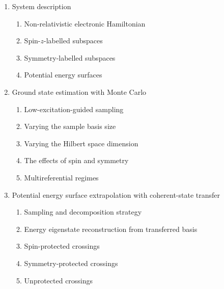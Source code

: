 \documentclass[12pt]{article}
\begin{document}
\begin{enumerate}
\begin{enumerate}
		\item System description
		
		\begin{enumerate}
		
			\item Non-relativistic electronic Hamiltonian
			
			\item Spin-$z$-labelled subspaces
			
			\item Symmetry-labelled subspaces
			
			\item Potential energy surfaces
		
		\end{enumerate}
		
		\item Ground state estimation with Monte Carlo
		
		\begin{enumerate}
		
			\item Low-excitation-guided sampling
			
			\item Varying the sample basis size
			
			\item Varying the Hilbert space dimension
			
			\item The effects of spin and symmetry
			
			\item Multireferential regimes
		
		\end{enumerate}
		
		\item Potential energy surface extrapolation with coherent-state transfer
		
		\begin{enumerate}
		
			\item Sampling and decomposition strategy
			
			\item Energy eigenstate reconstruction from transferred basis
			
			\item Spin-protected crossings
			
			\item Symmetry-protected crossings
			
			\item Unprotected crossings
			

\end{enumerate}
\end{enumerate}
\end{enumerate}
\end{document}

